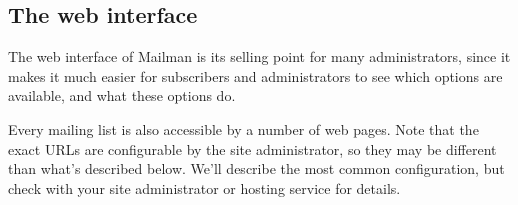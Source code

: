 \documentclass{howto}
\begin{document}
\subsection{The web interface\label{sec:web}}
The web interface of Mailman is its selling point for many administrators,
since it makes it much easier for subscribers and administrators to see 
which options are available, and what these options do.  

Every mailing list is also accessible by a number of web pages.  Note that
the exact URLs are configurable by the site administrator, so they may be
different than what's described below.  We'll describe the most common
configuration, but check with your site administrator or hosting
service for details.
\end{document}
